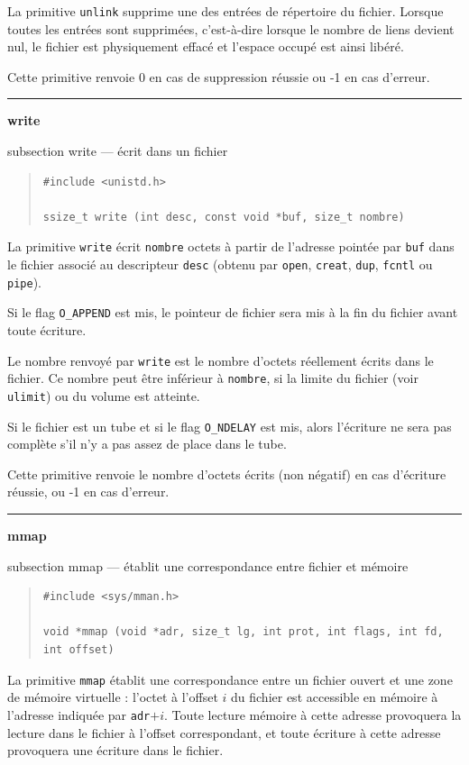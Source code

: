 \documentclass [twoside] {report}
\newcommand {\primitive} [1]
    {
	\phantomsection
	{\large \textbf {#1}}
	\addcontentsline {toc} {subsection} {#1}
    }
\newcommand {\separation}
    {
	\vspace {5mm}
	\nopagebreak
	\hrule
    }
\begin{document}
La primitive \texttt {unlink} supprime une des entrées
de répertoire du fichier. Lorsque toutes les
entrées sont supprimées, c'est-à-dire lorsque le
nombre de liens devient nul, le fichier est
physiquement effacé et l'espace occupé est ainsi
libéré.

Cette primitive renvoie 0 en cas de suppression
réussie ou -1 en cas d'erreur.




\separation
\primitive {write} --- écrit dans un fichier

\begin {quote}
\begin {verbatim}
#include <unistd.h>

ssize_t write (int desc, const void *buf, size_t nombre)
\end{verbatim}
\end {quote}

La primitive \texttt {write} écrit \texttt {nombre} octets à
partir de l'adresse pointée par \texttt {buf} dans le
fichier associé au descripteur \texttt {desc} (obtenu par
\texttt {open}, \texttt {creat}, \texttt {dup}, \texttt {fcntl} ou \texttt {pipe}).

Si le flag \texttt {O\_APPEND} est mis, le pointeur de
fichier sera mis à la fin du fichier avant toute
écriture.

Le nombre renvoyé par \texttt {write} est le nombre
d'octets réellement écrits dans le fichier. Ce
nombre peut être inférieur à \texttt {nombre}, si la
limite du fichier (voir \texttt {ulimit}) ou du volume
est atteinte.

Si le fichier est un tube et si le flag
\texttt {O\_NDELAY} est mis, alors l'écriture ne sera pas
complète s'il n'y a pas assez de place dans le
tube.

Cette primitive renvoie le nombre d'octets écrits
(non négatif) en cas d'écriture
réussie, ou -1 en cas d'erreur.


\separation
\primitive {mmap} --- établit une correspondance entre fichier et mémoire
    \label {mmap}

\begin {quote}
\begin {verbatim}
#include <sys/mman.h>

void *mmap (void *adr, size_t lg, int prot, int flags, int fd, int offset)
\end{verbatim}
\end {quote}

La primitive \texttt {mmap} établit une correspondance entre un fichier
ouvert et une zone de mémoire virtuelle : l'octet à l'offset $i$ du
fichier est accessible en mémoire à l'adresse indiquée par \texttt
{adr}$+i$. Toute lecture mémoire à cette adresse provoquera la lecture
dans le fichier à l'offset correspondant, et toute écriture à cette
adresse provoquera une écriture dans le fichier.
\end{document}

